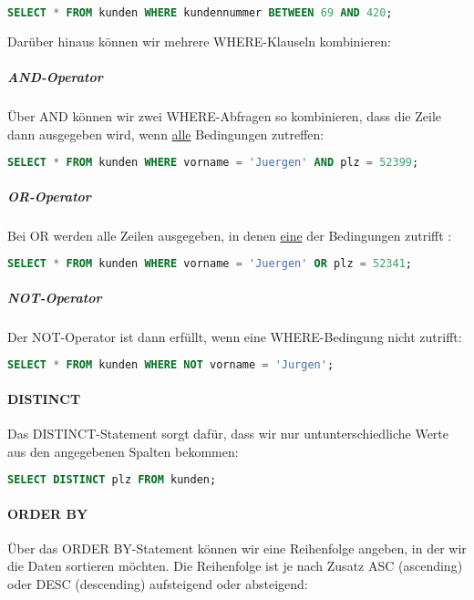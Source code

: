 \documentclass{article}
\begin{document}
	\begin{lstlisting}[language=SQL]
	SELECT * FROM kunden WHERE kundennummer BETWEEN 69 AND 420;
	\end{lstlisting}

	Darüber hinaus können wir mehrere WHERE-Klauseln kombinieren:

	\subparagraph{AND-Operator}
	Über AND können wir zwei WHERE-Abfragen so kombinieren, dass die Zeile dann ausgegeben wird, wenn \underline{alle} Bedingungen zutreffen:

	\begin{lstlisting}[language=SQL, caption=Abfrage aller Kunden namens "Jürgen" in 52399]
	SELECT * FROM kunden WHERE vorname = 'Juergen' AND plz = 52399;
	\end{lstlisting}

	\subparagraph{OR-Operator}
	Bei OR werden alle Zeilen ausgegeben, in denen \underline{eine} der Bedingungen zutrifft :

	\begin{lstlisting}[language=SQL, caption=Abfrage aller Kunden mit Vorname "Jürgen" oder PLZ 52341]
	SELECT * FROM kunden WHERE vorname = 'Juergen' OR plz = 52341;
	\end{lstlisting}

	\subparagraph{NOT-Operator}
	Der NOT-Operator ist dann erfüllt, wenn eine WHERE-Bedingung nicht zutrifft:

	\begin{lstlisting}[language=SQL]
	SELECT * FROM kunden WHERE NOT vorname = 'Jurgen';
	\end{lstlisting}

	\paragraph{DISTINCT}
	Das DISTINCT-Statement sorgt dafür, dass wir nur untunterschiedliche Werte aus den angegebenen Spalten bekommen:

	\begin{lstlisting}[language=SQL, caption=Postleitzahlen aller Orte mit registrierten Kunden]
	SELECT DISTINCT plz FROM kunden;
	\end{lstlisting}

	\paragraph{ORDER BY}
	Über das ORDER BY-Statement können wir eine Reihenfolge angeben, in der wir die Daten sortieren möchten. Die Reihenfolge ist je nach Zusatz ASC (ascending) oder DESC (descending) aufsteigend oder absteigend:
\end{document}
